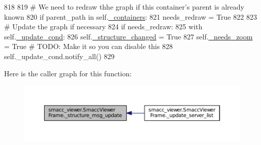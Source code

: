 \begin{DoxyCode}
818 
819             \textcolor{comment}{# We need to redraw thhe graph if this container's parent is already known}
820             \textcolor{keywordflow}{if} parent\_path \textcolor{keywordflow}{in} self.\hyperlink{classsmacc__viewer_1_1SmaccViewerFrame_a00ea07c6cc068340230dcac273ad5e90}{\_containers}:
821                 needs\_redraw = \textcolor{keyword}{True}
822 
823         \textcolor{comment}{# Update the graph if necessary}
824         \textcolor{keywordflow}{if} needs\_redraw:
825             with self.\hyperlink{classsmacc__viewer_1_1SmaccViewerFrame_a87c1757aa21438ca8692b2f079b8f393}{\_update\_cond}:
826                 self.\hyperlink{classsmacc__viewer_1_1SmaccViewerFrame_aa5d9c77b0c46dfb7d5258d1efbcc74b0}{\_structure\_changed} = \textcolor{keyword}{True}
827                 self.\hyperlink{classsmacc__viewer_1_1SmaccViewerFrame_a2307d88cbcee116cf8a6fa2201aedc44}{\_needs\_zoom} = \textcolor{keyword}{True} \textcolor{comment}{# TODO: Make it so you can disable this}
828                 self.\_update\_cond.notify\_all()
829 
\end{DoxyCode}


Here is the caller graph for this function\+:
\nopagebreak
\begin{figure}[H]
\begin{center}
\leavevmode
\includegraphics[width=350pt]{classsmacc__viewer_1_1SmaccViewerFrame_a6109f62a87363f5254173cbb1467bcc8_icgraph}
\end{center}
\end{figure}



